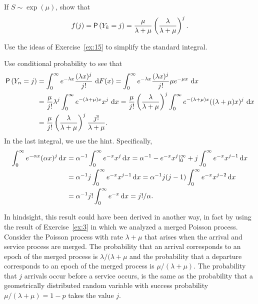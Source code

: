 \begin{exercise}
 If $S\sim \exp(\mu)$, show that 
  \begin{equation} \label{eq:41}
f(j) = \P{Y_k = j} = \frac{\mu}{\lambda+\mu}\left(\frac{\lambda}{\lambda+\mu}\right)^j.
  \end{equation}
  \begin{hint}
Use the ideas of Exercise~\ref{ex:15} to simplify the standard integral.
  \end{hint}
  \begin{solution}
Use conditional probability to see that 
\begin{align*}
  \P{Y_n = j} 
&= \int_0^\infty e^{-\lambda x}\frac{(\lambda x)^j}{j!}\, \d F(x) = \int_0^\infty e^{-\lambda x}\frac{(\lambda x)^j}{j!} \mu e^{-\mu x}\, \d x \\
&= \frac{\mu}{j!}\lambda^j \int_0^\infty e^{-(\lambda+\mu) x}x^j\,\d x = \frac{\mu}{j!}\left(\frac{\lambda}{\lambda+\mu}\right)^j \int_0^\infty e^{-(\lambda+\mu) x}((\lambda+\mu)x)^j\,\d x \\
&= \frac{\mu}{j!}\left(\frac{\lambda}{\lambda+\mu}\right)^j \frac{j!}{\lambda+\mu}.
\end{align*}
In the last integral, we use the hint. Specifically, 
\begin{align*}
  \int_0^\infty e^{-\alpha x} (\alpha x)^j \,\text{d}x 
&=  \alpha^{-1} \int_0^\infty e^{- x} x^j \,\text{d}x  
=  \alpha^{-1} -e^{-x}x^j |_0^\infty + j \int_0^\infty e^{- x} x^{j-1} \,\text{d}x \\
&= \alpha^{-1} j \int_0^\infty e^{- x} x^{j-1} \,\text{d}x 
= \alpha^{-1} j(j-1) \int_0^\infty e^{- x} x^{j-2} \,\text{d}x \\
&= \alpha^{-1} j! \int_0^\infty e^{- x} \,\text{d}x 
= j!/\alpha.
\end{align*}


In hindsight, this result could have been derived in another way, in
fact by using the result of Exercise~\ref{ex:3} in which we analyzed a
merged Poisson process. Consider the Poisson process with rate
$\lambda+\mu$ that arises when the arrival and service process are
merged. The probability that an arrival corresponds to an epoch of the
merged process is $\lambda/(\lambda+\mu$ and the probability that a
departure corresponds to an epoch of the merged process is
$\mu/(\lambda+\mu)$.  The probability that $j$ arrivals occur before a
service occurs, is the same as the probability that a geometrically
distributed random variable with success probability
$\mu/(\lambda+\mu) = 1-p$ takes the value $j$.
  \end{solution}
\end{exercise}


